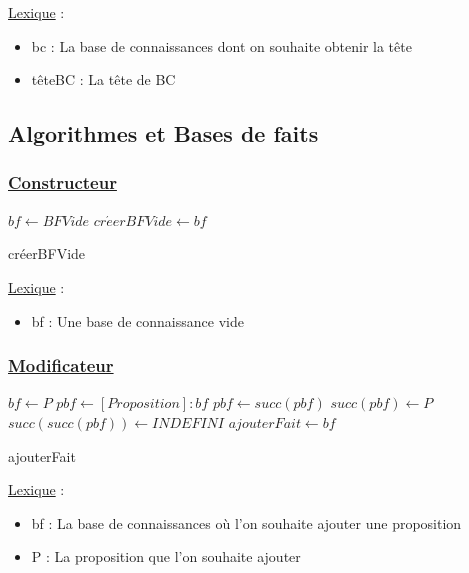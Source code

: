 \documentclass{article}
\begin{document}
\underline{Lexique} :
\begin{itemize}
    \item bc : La base de connaissances dont on souhaite obtenir la tête
    \item têteBC : La tête de BC
\end{itemize}


\subsection{Algorithmes et Bases de faits}
\subsubsection{\underline{Constructeur}}
\begin{algorithm}
    \SetAlgoLined 
    \KwData{}
    
    \begin{algorithmic}
        \STATE $bf \gets BFVide$
        \STATE $cr\acute{e}erBFVide \gets bf$
    \end{algorithmic}
    \caption{créerBFVide}
\end{algorithm}

\underline{Lexique} :
\begin{itemize}
    \item bf : Une base de connaissance vide
\end{itemize}

\subsubsection{\underline{Modificateur}}
\begin{algorithm}
    \SetAlgoLined 
    
    \begin{algorithmic}
            \STATE $bf \gets P$
        \ELSE
            \STATE $pbf \gets [Proposition] : bf$
                \STATE $pbf \gets succ(pbf)$
            \ENDWHILE
            \STATE $succ(pbf) \gets P$
            \STATE $succ(succ(pbf)) \gets INDEFINI$
        \ENDIF
        \STATE $ajouterFait \gets bf$
    \end{algorithmic}
    \caption{ajouterFait}
\end{algorithm}
\clearpage
\underline{Lexique} :
\begin{itemize}
    \item bf : La base de connaissances où l'on souhaite ajouter une proposition
    \item P : La proposition que l'on souhaite ajouter
\end{itemize}
\end{document}
